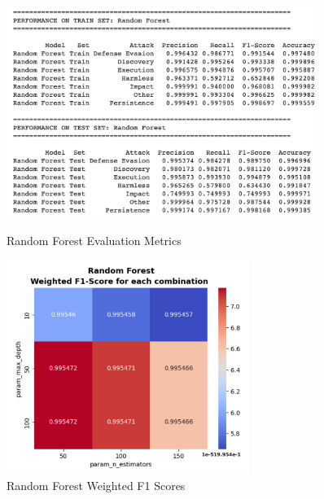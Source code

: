 \begin{figure}[H]
            \begin{minipage}{\textwidth}
                \begin{minipage}[c]{0.48\textwidth}
                    \centering
                    \includegraphics[width=0.9\textwidth]{../figures/plots/section2/Random_Forest_evaluation_metrics.png}
                    \caption{Random Forest Evaluation Metrics}
                    \label{fig:rf_em_base}
                \end{minipage}%
                \hfill%
                \begin{minipage}[c]{0.48\textwidth}
                    \centering
                    \includegraphics[width=0.7\textwidth]{../figures/plots/section2/weighted_f1_score_for_each_combination_of_parameters_random_forest.png}
                    \caption{Random Forest Weighted F1 Scores}
                    \label{fig:rf_f1_tuning}
                \end{minipage}
            \end{minipage}
            

\end{figure}
